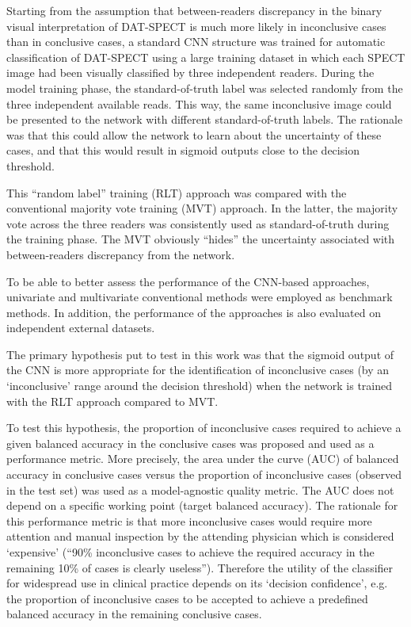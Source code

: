 Starting from the assumption that between-readers discrepancy in the binary visual interpretation of DAT-SPECT is much more likely in inconclusive cases 
than in conclusive cases, a standard CNN structure was trained for automatic classification of DAT-SPECT using a large training dataset in which each 
SPECT image had been visually classified by three independent readers. 
During the model training phase, the standard-of-truth label was selected randomly from the three independent available reads. 
This way, the same inconclusive image could be presented to the network with different standard-of-truth labels. 
The rationale was that this could allow the network to learn about the uncertainty of these cases, 
and that this would result in sigmoid outputs close to the decision threshold.

This “random label” training (RLT) approach was compared with the conventional majority vote training (MVT) approach. 
In the latter,  the majority vote across the three readers was consistently used as standard-of-truth during the training phase. 
The MVT obviously “hides” the uncertainty associated with between-readers discrepancy from the network. 

To be able to better assess the performance of the CNN-based approaches, univariate and multivariate conventional methods were employed as 
benchmark methods. In addition, the performance of the approaches is also evaluated on independent external datasets.


The primary hypothesis put to test in this work was that the sigmoid output of the CNN is more appropriate for the identification of inconclusive cases 
(by an `inconclusive' range around the decision threshold) when the network is trained with the RLT approach compared to MVT.

To test this hypothesis, the proportion of inconclusive cases required to achieve a given balanced accuracy in the conclusive cases 
was proposed and used as a performance metric.
More precisely, the area under the curve (AUC) of balanced accuracy in conclusive cases versus the proportion of inconclusive cases 
(observed in the test set) was used as a model-agnostic quality metric. 
The AUC does not depend on a specific working point (target balanced accuracy).  
The rationale for this performance metric is that more inconclusive cases would require more attention and manual inspection 
by the attending physician which is considered `expensive'
(“90\% inconclusive cases to achieve the required accuracy in the remaining 10\% of cases is clearly useless”).
Therefore the utility of the classifier for widespread use in clinical practice depends on its `decision confidence', 
e.g. the proportion of inconclusive cases to be accepted to achieve a predefined balanced accuracy in the remaining conclusive cases. 


